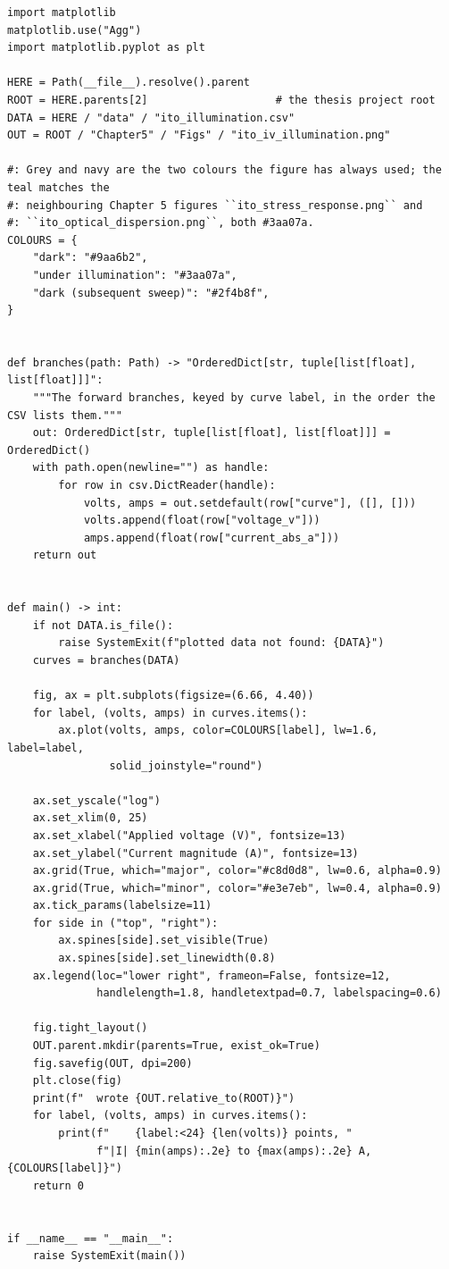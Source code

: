 \documentclass[a4paper,10pt]{article}
\begin{document}
\begin{Verbatim}
import matplotlib
matplotlib.use("Agg")
import matplotlib.pyplot as plt

HERE = Path(__file__).resolve().parent
ROOT = HERE.parents[2]                    # the thesis project root
DATA = HERE / "data" / "ito_illumination.csv"
OUT = ROOT / "Chapter5" / "Figs" / "ito_iv_illumination.png"

#: Grey and navy are the two colours the figure has always used; the teal matches the
#: neighbouring Chapter 5 figures ``ito_stress_response.png`` and
#: ``ito_optical_dispersion.png``, both #3aa07a.
COLOURS = {
    "dark": "#9aa6b2",
    "under illumination": "#3aa07a",
    "dark (subsequent sweep)": "#2f4b8f",
}


def branches(path: Path) -> "OrderedDict[str, tuple[list[float], list[float]]]":
    """The forward branches, keyed by curve label, in the order the CSV lists them."""
    out: OrderedDict[str, tuple[list[float], list[float]]] = OrderedDict()
    with path.open(newline="") as handle:
        for row in csv.DictReader(handle):
            volts, amps = out.setdefault(row["curve"], ([], []))
            volts.append(float(row["voltage_v"]))
            amps.append(float(row["current_abs_a"]))
    return out


def main() -> int:
    if not DATA.is_file():
        raise SystemExit(f"plotted data not found: {DATA}")
    curves = branches(DATA)

    fig, ax = plt.subplots(figsize=(6.66, 4.40))
    for label, (volts, amps) in curves.items():
        ax.plot(volts, amps, color=COLOURS[label], lw=1.6, label=label,
                solid_joinstyle="round")

    ax.set_yscale("log")
    ax.set_xlim(0, 25)
    ax.set_xlabel("Applied voltage (V)", fontsize=13)
    ax.set_ylabel("Current magnitude (A)", fontsize=13)
    ax.grid(True, which="major", color="#c8d0d8", lw=0.6, alpha=0.9)
    ax.grid(True, which="minor", color="#e3e7eb", lw=0.4, alpha=0.9)
    ax.tick_params(labelsize=11)
    for side in ("top", "right"):
        ax.spines[side].set_visible(True)
        ax.spines[side].set_linewidth(0.8)
    ax.legend(loc="lower right", frameon=False, fontsize=12,
              handlelength=1.8, handletextpad=0.7, labelspacing=0.6)

    fig.tight_layout()
    OUT.parent.mkdir(parents=True, exist_ok=True)
    fig.savefig(OUT, dpi=200)
    plt.close(fig)
    print(f"  wrote {OUT.relative_to(ROOT)}")
    for label, (volts, amps) in curves.items():
        print(f"    {label:<24} {len(volts)} points, "
              f"|I| {min(amps):.2e} to {max(amps):.2e} A, {COLOURS[label]}")
    return 0


if __name__ == "__main__":
    raise SystemExit(main())
\end{Verbatim}
\end{document}
